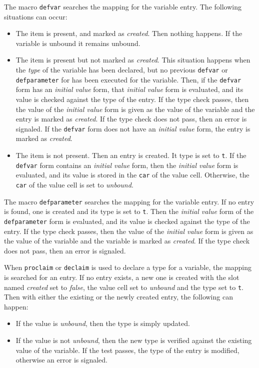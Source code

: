 The macro \texttt{defvar} searches the mapping for the variable entry.
The following situations can occur:
\begin{itemize}
\item The item is present, and marked as \emph{created}.  Then nothing
  happens.  If the variable is unbound it remains unbound.
\item The item is present but not marked as \emph{created}.  This
  situation happens when the \emph{type} of the variable has been
  declared, but no previous \texttt{defvar} or \texttt{defparameter}
  for has been executed for the variable.  Then, if the
  \texttt{defvar} form has an \emph{initial value} form, that
  \emph{initial value} form is evaluated, and its value is checked
  against the type of the entry.  If the type check passes, then the
  value of the \emph{initial value} form is given as the value of the
  variable and the entry is marked as \emph{created}.  If the type
  check does not pass, then an error is signaled.  If the
  \texttt{defvar} form does not have an \emph{initial value} form, the
  entry is marked as \emph{created}.
\item The item is not present.  Then an entry is created.  It type is
  set to \texttt{t}.  If the \texttt{defvar} form contains
  an \emph{initial value} form, then the \emph{initial value} form is
  evaluated, and its value is stored in the \texttt{car} of the value
  cell.  Otherwise, the \texttt{car} of the value cell is set to
  \emph{unbound}. 
\end{itemize}

The macro \texttt{defparameter} searches the mapping for the variable
entry.  If no entry is found, one is created and its type is set to
\texttt{t}.  Then the \emph{initial value} form of the
\texttt{defparameter} form is evaluated, and its value is checked
against the type of the entry.  If the type check passes, then the
value of the \emph{initial value} form is given as the value of the
variable and the variable is marked as \emph{created}.  If the type
check does not pass, then an error is signaled.

When \texttt{proclaim} or \texttt{declaim} is used to declare a type
for a variable, the mapping is searched for an entry.  If no entry
exists, a new one is created with the slot named \emph{created} set to
\emph{false}, the value cell set to \emph{unbound} and the type set to
\texttt{t}.  Then with either the existing or the newly created entry,
the following can happen:

\begin{itemize}
\item If the value is \emph{unbound}, then the type is simply
  updated.  
\item If the value is not \emph{unbound}, then the new type is
  verified against the existing value of the variable.  If the test
  passes, the type of the entry is modified, otherwise an error is
  signaled. 
\end{itemize}

